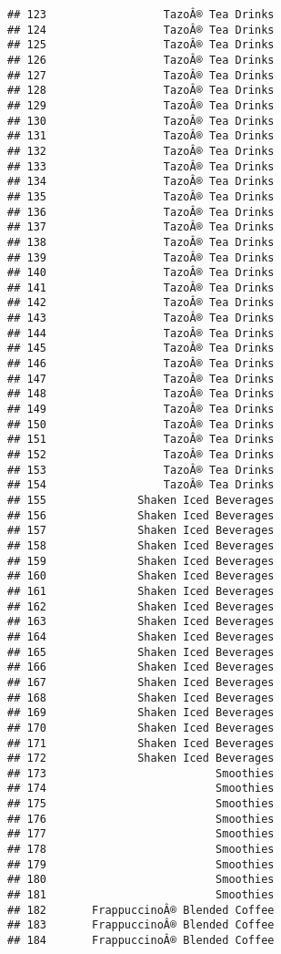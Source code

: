 \documentclass[
]{article}
\begin{document}
\begin{verbatim}
## 123                  TazoÂ® Tea Drinks
## 124                  TazoÂ® Tea Drinks
## 125                  TazoÂ® Tea Drinks
## 126                  TazoÂ® Tea Drinks
## 127                  TazoÂ® Tea Drinks
## 128                  TazoÂ® Tea Drinks
## 129                  TazoÂ® Tea Drinks
## 130                  TazoÂ® Tea Drinks
## 131                  TazoÂ® Tea Drinks
## 132                  TazoÂ® Tea Drinks
## 133                  TazoÂ® Tea Drinks
## 134                  TazoÂ® Tea Drinks
## 135                  TazoÂ® Tea Drinks
## 136                  TazoÂ® Tea Drinks
## 137                  TazoÂ® Tea Drinks
## 138                  TazoÂ® Tea Drinks
## 139                  TazoÂ® Tea Drinks
## 140                  TazoÂ® Tea Drinks
## 141                  TazoÂ® Tea Drinks
## 142                  TazoÂ® Tea Drinks
## 143                  TazoÂ® Tea Drinks
## 144                  TazoÂ® Tea Drinks
## 145                  TazoÂ® Tea Drinks
## 146                  TazoÂ® Tea Drinks
## 147                  TazoÂ® Tea Drinks
## 148                  TazoÂ® Tea Drinks
## 149                  TazoÂ® Tea Drinks
## 150                  TazoÂ® Tea Drinks
## 151                  TazoÂ® Tea Drinks
## 152                  TazoÂ® Tea Drinks
## 153                  TazoÂ® Tea Drinks
## 154                  TazoÂ® Tea Drinks
## 155              Shaken Iced Beverages
## 156              Shaken Iced Beverages
## 157              Shaken Iced Beverages
## 158              Shaken Iced Beverages
## 159              Shaken Iced Beverages
## 160              Shaken Iced Beverages
## 161              Shaken Iced Beverages
## 162              Shaken Iced Beverages
## 163              Shaken Iced Beverages
## 164              Shaken Iced Beverages
## 165              Shaken Iced Beverages
## 166              Shaken Iced Beverages
## 167              Shaken Iced Beverages
## 168              Shaken Iced Beverages
## 169              Shaken Iced Beverages
## 170              Shaken Iced Beverages
## 171              Shaken Iced Beverages
## 172              Shaken Iced Beverages
## 173                          Smoothies
## 174                          Smoothies
## 175                          Smoothies
## 176                          Smoothies
## 177                          Smoothies
## 178                          Smoothies
## 179                          Smoothies
## 180                          Smoothies
## 181                          Smoothies
## 182       FrappuccinoÂ® Blended Coffee
## 183       FrappuccinoÂ® Blended Coffee
## 184       FrappuccinoÂ® Blended Coffee

\end{verbatim}
\end{document}

